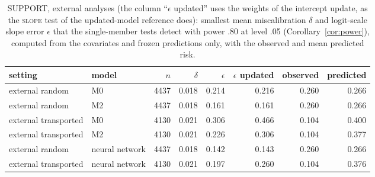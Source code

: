 \begin{table}[ht]\centering\footnotesize
\caption{SUPPORT, external analyses (the column ``$\epsilon$ updated'' uses the weights of the intercept update, as the \textsc{slope} test of the updated-model reference does): smallest mean miscalibration $\delta$ and logit-scale slope error $\epsilon$ that the single-member tests detect with power .80 at level .05 (Corollary~\ref{cor:power}), computed from the covariates and frozen predictions only, with the observed and mean predicted risk.}\label{tab:plan}
\begin{tabular}{llrrrrrr}\toprule setting & model & $n$ & $\delta$ & $\epsilon$ & $\epsilon$ updated & observed & predicted\\ \midrule
external random & M0 & 4437 & 0.018 & 0.214 & 0.216 & 0.260 & 0.266\\
external random & M2 & 4437 & 0.018 & 0.161 & 0.161 & 0.260 & 0.266\\
external transported & M0 & 4130 & 0.021 & 0.306 & 0.466 & 0.104 & 0.400\\
external transported & M2 & 4130 & 0.021 & 0.226 & 0.306 & 0.104 & 0.377\\
external random & neural network & 4437 & 0.018 & 0.142 & 0.143 & 0.260 & 0.266\\
external transported & neural network & 4130 & 0.021 & 0.197 & 0.260 & 0.104 & 0.376\\
\bottomrule\end{tabular}\end{table}
